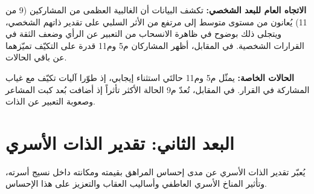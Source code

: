 \documentclass[12pt,oneside]{report}
\begin{document}
\noindent\textbf{الاتجاه العام للبعد الشخصي:} تكشف البيانات أن الغالبية العظمى من المشاركين (9 من 11) يُعانون من مستوى متوسط إلى مرتفع من الأثر السلبي على تقدير ذاتهم الشخصي، ويتجلى ذلك بوضوح في ظاهرة الانسحاب من التعبير عن الرأي وضعف الثقة في القرارات الشخصية. في المقابل، أظهر المشاركان م5 وم11 قدرة على التكيّف تميّزهما عن باقي الحالات.\par
\noindent\textbf{الحالات الخاصة:} يمثّل م5 وم11 حالتَي استثناء إيجابي، إذ طوّرا آليات تكيّف مع غياب المشاركة في القرار. في المقابل، تُعدّ م9 الحالة الأكثر تأثراً إذ أضافت بُعد كبت المشاعر وصعوبة التعبير عن الذات.\par
\section{البعد الثاني: تقدير الذات الأسري}
يُعبّر تقدير الذات الأسري عن مدى إحساس المراهق بقيمته ومكانته داخل نسيج أسرته، وتأثير المناخ الأسري العاطفي وأساليب العقاب والتعزيز على هذا الإحساس.
\end{document}
